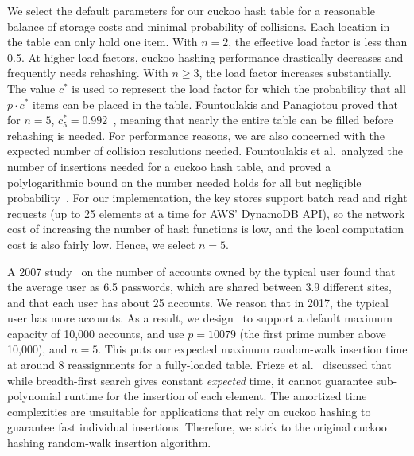  \label{sec:parameter_selection}
We select the default parameters for our cuckoo hash table for a reasonable balance of storage costs and minimal probability of collisions. Each location in the table can only hold one item. With $n = 2$, the effective load factor is less than 0.5. At higher load factors, cuckoo hashing performance drastically decreases and frequently needs rehashing.
With $n \ge 3$, the load factor increases substantially.  The value $c^*$ is used to represent the load factor for which the probability that all $p \cdot c^*$ items can be placed in the table. Fountoulakis and Panagiotou proved that for $n = 5$, $c^*_5 = 0.992$~\cite{Fountoulakis2009}, meaning that nearly the entire table can be filled before rehashing is needed. For performance reasons, we are also concerned with the expected number of collision resolutions needed. Fountoulakis et al.\ analyzed the number of insertions needed for a cuckoo hash table, and proved a polylogarithmic bound on the number needed holds for all but negligible probability~\cite{Fountaoulakis2010}.  
For our implementation, the key stores support batch read and right requests (up to 25 elements at a time for AWS' DynamoDB API), so the network cost of increasing the number of hash functions is low, and the local computation cost is also fairly low. Hence, we select $n = 5$. 

A 2007 study~\cite{Florencio2007} on the number of accounts owned by the typical user found that the average user as 6.5 passwords, which are shared between 3.9 different sites, and that each user has about 25 accounts. We reason that in 2017, the typical user has more accounts. As a result, we design \SecPass\ to support a default maximum capacity of 10,000 accounts, and use $p = 10079$ (the first prime number above 10,000), and $n = 5$. This puts our expected maximum random-walk insertion time at around 8 reassignments for a fully-loaded table. %
Frieze et al.~\cite{Frieze2011} discussed that while breadth-first search gives constant \textit{expected} time, it cannot guarantee sub-polynomial runtime for the insertion of each element. The amortized time complexities are unsuitable for applications that rely on cuckoo hashing to guarantee fast individual insertions. Therefore, we stick to the original cuckoo hashing random-walk insertion algorithm.  

